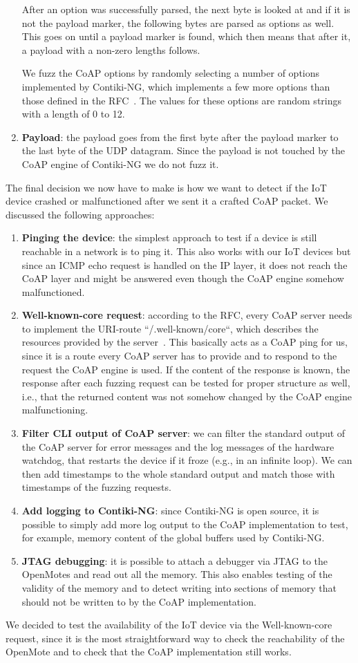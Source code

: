 \begin{enumerate}
	After an option was successfully parsed, the next byte is looked at and if it is not the payload marker, the following bytes are parsed as options as well. This goes on until a payload marker is found, which then means that after it, a payload with a non-zero lengths follows.

	We fuzz the CoAP options by randomly selecting a number of options implemented by Contiki-NG, which implements a few more options than those defined in the RFC~\cite{RFC7252}. The values for these options are random strings with a length of 0 to 12.
	\item \textbf{Payload}: the payload goes from the first byte after the payload marker to the last byte of the UDP datagram. Since the payload is not touched by the CoAP engine of Contiki-NG we do not fuzz it.
\end{enumerate}

The final decision we now have to make is how we want to detect if the IoT device crashed or malfunctioned after we sent it a crafted CoAP packet. We discussed the following approaches:
\begin{enumerate}
	\item \textbf{Pinging the device}: the simplest approach to test if a device is still reachable in a network is to ping it. This also works with our IoT devices but since an ICMP echo request is handled on the IP layer, it does not reach the CoAP layer and might be answered even though the CoAP engine somehow malfunctioned.
	\item \textbf{Well-known-core request}: according to the RFC, every CoAP server needs to implement the URI-route ``/.well-known/core``, which describes the resources provided by the server~\cite{RFC7252}. This basically acts as a CoAP ping for us, since it is a route every CoAP server has to provide and to respond to the request the CoAP engine is used. If the content of the response is known, the response after each fuzzing request can be tested for proper structure as well, i.e., that the returned content was not somehow changed by the CoAP engine malfunctioning.
	\item \textbf{Filter CLI output of CoAP server}: we can filter the standard output of the CoAP server for error messages and the log messages of the hardware watchdog, that restarts the device if it froze (e.g., in an infinite loop). We can then add timestamps to the whole standard output and match those with timestamps of the fuzzing requests.
	\item \textbf{Add logging to Contiki-NG}: since Contiki-NG is open source, it is possible to simply add more log output to the CoAP implementation to test, for example, memory content of the global buffers used by Contiki-NG.
	\item \textbf{JTAG debugging}: it is possible to attach a debugger via JTAG to the OpenMotes and read out all the memory. This also enables testing of the validity of the memory and to detect writing into sections of memory that should not be written to by the CoAP implementation.
\end{enumerate}

We decided to test the availability of the IoT device via the Well-known-core request, since it is the most straightforward way to check the reachability of the OpenMote and to check that the CoAP implementation still works.
